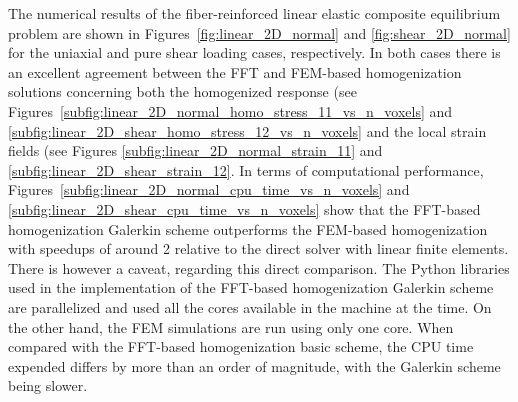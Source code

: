 The numerical results of the fiber-reinforced linear elastic composite equilibrium problem are shown in Figures~\ref{fig:linear_2D_normal} and \ref{fig:shear_2D_normal} for the uniaxial and pure shear loading cases, respectively.
In both cases there is an excellent agreement between the FFT and FEM-based homogenization solutions concerning both the homogenized response (see Figures~\ref{subfig:linear_2D_normal_homo_stress_11_vs_n_voxels} and \ref{subfig:linear_2D_shear_homo_stress_12_vs_n_voxels} and the local strain fields (see Figures \ref{subfig:linear_2D_normal_strain_11} and \ref{subfig:linear_2D_shear_strain_12}.
In terms of computational performance, Figures~\ref{subfig:linear_2D_normal_cpu_time_vs_n_voxels} and \ref{subfig:linear_2D_shear_cpu_time_vs_n_voxels} show that the FFT-based homogenization Galerkin scheme outperforms the FEM-based homogenization with speedups of around 2 relative to the direct solver with linear finite elements.
There is however a caveat, regarding this direct comparison.
The Python libraries used in the implementation of the FFT-based homogenization Galerkin scheme are parallelized and used all the cores available in the machine at the time.
On the other hand, the FEM simulations are run using only one core.
When compared with the FFT-based homogenization basic scheme, the CPU time expended differs by more than an order of magnitude, with the Galerkin scheme being slower.

